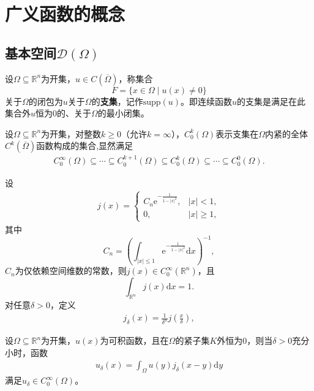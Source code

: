 \documentclass[../../main.tex]{subfiles}%
\begin{document}
\section{广义函数的概念}

\subsection{基本空间$\mathscr{D}(\Omega)$}

\begin{definition}
设$\Omega\subseteq\mathbb{R}^n$为开集，$u\in C(\overline{\Omega})$，称集合
$$F=\{x\in\Omega\mid u(x)\neq0\}$$
关于$\Omega$的闭包为$u$关于$\Omega$的\textbf{支集}，记作$\mathrm{supp}(u)$。即连续函数$u$的支集是满足在此集合外$u$恒为0的、关于$\Omega$的最小闭集。
\end{definition}

\begin{definition}
设$\Omega\subseteq\mathbb{R}^n$为开集，对整数$k\geqslant0$（允许$k=\infty$），$C_0^k(\Omega)$表示支集在$\Omega$内紧的全体$C^k(\overline{\Omega})$函数构成的集合,显然满足
\begin{align*}
C_0^\infty(\Omega)\subseteq\cdots\subseteq C_0^{k+1}(\Omega)\subseteq C_0^k(\Omega)\subseteq\cdots\subseteq C_0^0(\Omega).
\end{align*}
\end{definition}

\begin{example}
设
\begin{align}
j(x)=
\begin{cases}
C_n\mathrm{e}^{-\frac{1}{1-|x|^2}},&|x|<1,\\
0,&|x|\geqslant1,
\end{cases}\label{eq:molify_base}
\end{align}
其中
$$C_n=\left(\int_{|x|\leqslant1}\mathrm{e}^{-\frac{1}{1-|x|^2}}\mathrm{d}x\right)^{-1},$$
$C_n$为仅依赖空间维数的常数，则$j(x)\in C_0^\infty(\mathbb{R}^n)$，且
$$\int_{\mathbb{R}^n}j(x)\mathrm{d}x=1.$$
对任意$\delta>0$，定义
\begin{align}
j_\delta(x)=\frac{1}{\delta^n}j\left(\frac{x}{\delta}\right),\label{eq:molify_delta}
\end{align}
\end{example}

\begin{proposition}
设$\Omega\subseteq\mathbb{R}^n$为开集，$u(x)$为可积函数，且在$\Omega$的紧子集$K$外恒为0，则当$\delta>0$充分小时，函数
\begin{align}
u_\delta(x)=\int_{\Omega}u(y)j_\delta(x-y)\mathrm{d}y\label{eq:convolution_molify}
\end{align}
满足$u_\delta\in C_0^\infty(\Omega)$。
\end{proposition}
\end{document}
